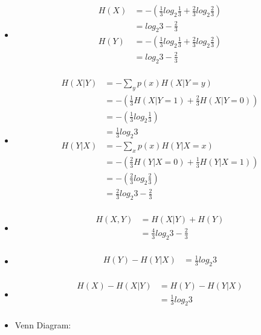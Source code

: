 \documentclass{article}
\begin{document}
\begin{itemize}
    \item 
    \begin{align}
    H(X)&=-(\frac{1}{3}log_2\frac{1}{3}+\frac{2}{3}log_2\frac{2}{3})\\
        &=log_2 3-\frac{2}{3}\\
    H(Y)&=-(\frac{1}{3}log_2\frac{1}{3}+\frac{2}{3}log_2\frac{2}{3})\\
        &=log_2 3-\frac{2}{3}\\
    \end{align}
    \item
    \begin{align}
    H(X|Y)&=-\sum_{y}p(x)H(X|Y=y)\\
          &=-(\frac{1}{3}H(X|Y=1)+\frac{2}{3}H(X|Y=0))\\
          &=-(\frac{1}{3}log_2\frac{1}{3})\\
          &=\frac{1}{3}log_2 3\\
    H(Y|X)&=-\sum_{x}p(x)H(Y|X=x)\\
          &=-(\frac{2}{3}H(Y|X=0)+\frac{1}{3}H(Y|X=1))\\
          &=-(\frac{2}{3}log_2\frac{2}{3})\\
          &=\frac{2}{3}log_2 3-\frac{2}{3}\\
    \end{align}
    \item  
    \begin{align}
    H(X,Y)&=H(X|Y)+H(Y)\\
          &=\frac{4}{3}log_2 3-\frac{2}{3}\\
    \end{align}
    \item 
    \begin{align}
    H(Y)-H(Y|X)&=\frac{1}{3}log_2 3\\
    \end{align}
    \item 
    \begin{align}
    H(X)-H(X|Y)&=H(Y)-H(Y|X)\\
               &=\frac{1}{3}log_2 3\\
    \end{align}
    \item Venn Diagram:
\end{itemize}
\end{document}
